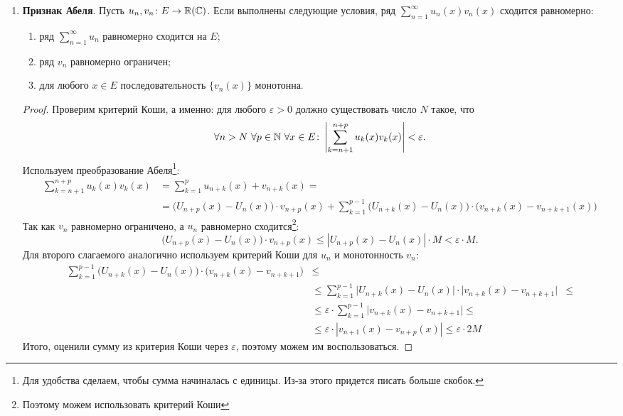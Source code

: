 \begin{prop}
\begin{enumerate}
\begin{ex}
			\end{ex}
		\item {\bf Признак Абеля}.  Пусть $ u_n, v_n \colon E \to \mathbb{R}(\mathbb{C})$. Если выполнены следующие условия, ряд $ \sum_{n=1}^{\infty} u_n(x)v_n(x)$ сходится равномерно:
			\begin{enumerate}[noitemsep]
				\item ряд $ \sum_{n=1}^{\infty} u_n$ равномерно сходится на $ E$;
				\item ряд $ v_n$ равномерно ограничен;
				\item для любого $ x \in E$ последовательность $ \{v_n(x)\}$ монотонна.
			\end{enumerate}
			\begin{proof}
				Проверим критерий Коши, а именно: для любого $ \varepsilon >0$ должно существовать число $ N$ такое, что
				\[
					\forall n > N ~ \forall p \in \mathbb{N} ~ \forall x \in E\colon \left|   \sum_{k=n+1}^{n+p} u_k(x)v_k(x)  \right| < \varepsilon
				.\]
				Используем преобразование Абеля\footnote{Для удобства сделаем, чтобы сумма начиналась с единицы. Из-за этого придется писать больше скобок.}:
				\[
					\begin{aligned}
						\sum_{k=n+1}^{n+p}u_k (x)v_k(x) &= \sum_{k=1}^{p} u_{n+k}(x) + v_{n+k}(x) =\\
														&= \bigl( U_{n+p}(x) - U_{n}(x) \bigr)\cdot  v_{n+p}(x) + \sum_{k=1}^{p-1} \bigl( U_{n+k}(x) - U_n(x) \bigr) \cdot \bigl( v_{n+k}(x)-v_{n+k+1}(x) \bigr)
					\end{aligned}
				\]
				Так как $ v_n$ равномерно ограничено, а $ u_n $ равномерно сходится\footnote{Поэтому можем использовать критерий Коши}:
				\[
					\bigl(U_{n+p}(x) - U_n(x)\bigr)\cdot v_{n+p}(x) \le \left| U_{n+p}(x) - U_n(x) \right| \cdot M < \varepsilon \cdot M
				.\]
				Для второго слагаемого аналогично используем критерий Коши для $ u_n$ и монотонность  $ v_n$:
				\[
					\begin{aligned}
						\sum_{k=1}^{p-1} \bigl(U_{n+k}(x) - U_n(x)\bigr) \cdot \bigl(v_{n+k}(x) - v_{n+k+1}\bigr) &\le \\
																												  & \le \sum_{k=1}^{p-1} \bigl|U_{n+k}(x) - U_n(x)\bigr| \cdot \bigl|v_{n+k}(x) - v_{n+k+1}\bigr| &\le \\
																												  & \le \varepsilon \cdot \sum_{k=1}^{p-1} \bigl|v_{n+k}(x) - v_{n+k+1}\bigr| \le \\
																												  & \le \varepsilon \cdot \left| v_{n+1}(x) - v_{n+p}(x) \right|  \le \varepsilon \cdot 2 M
					\end{aligned}
				\]
				Итого, оценили сумму из критерия Коши через $ \varepsilon $, поэтому можем им воспользоваться.
			\end{proof}
	\end{enumerate}
\end{prop}

